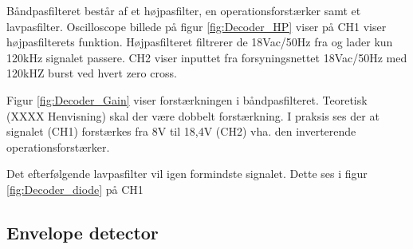 Båndpasfilteret består af et højpasfilter, en operationsforstærker samt et lavpasfilter. 
Oscilloscope billede på figur \ref{fig:Decoder_HP} viser på CH1 viser højpasfilterets funktion. Højpasfilteret filtrerer de 18Vac/50Hz fra og lader kun 120kHz signalet passere. CH2 viser inputtet fra forsyningsnettet 18Vac/50Hz med 120kHZ burst ved hvert zero cross.

Figur \ref{fig:Decoder_Gain} viser forstærkningen i båndpasfilteret. Teoretisk (XXXX Henvisning) skal der være dobbelt forstærkning. I praksis ses der at signalet (CH1) forstærkes fra 8V til 18,4V (CH2) vha. den inverterende operationsforstærker.

Det efterfølgende lavpasfilter vil igen formindste signalet. Dette ses i figur \ref{fig:Decoder_diode} på CH1 


\subsection{Envelope detector}

